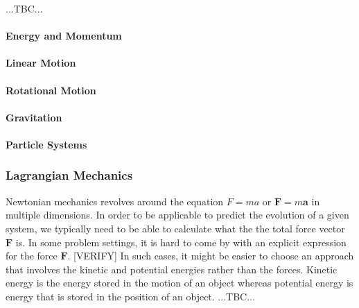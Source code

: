 ...TBC...

\paragraph{Energy and Momentum}

\paragraph{Linear Motion}

\paragraph{Rotational Motion}

\paragraph{Gravitation}

\paragraph{Particle Systems}




\subsubsection{Lagrangian Mechanics}
Newtonian mechanics revolves around the equation $F = m a$ or $\mathbf{F} = m \mathbf{a}$ in multiple dimensions. In order to be applicable to predict the evolution of a given system, we typically need to be able to calculate what the the total force vector $\mathbf{F}$ is. In some problem settings, it is hard to come by with an explicit expression for the force $\mathbf{F}$. [VERIFY] In such cases, it might be easier to choose an approach that involves the kinetic and potential energies rather than the forces. Kinetic energy is the energy stored in the motion of an object whereas potential energy is energy that is stored in the position of an object. ...TBC...

